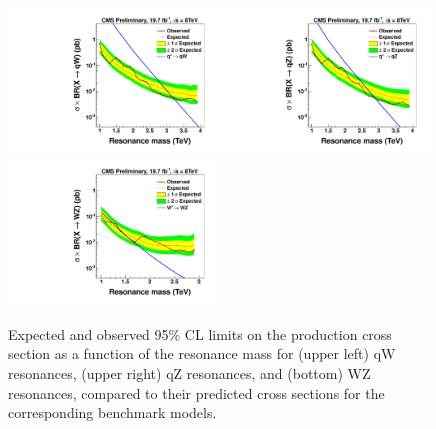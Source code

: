 \begin{figure}[h!tb]
\centering
\includegraphics[width=0.49\textwidth]{EXO-12-024/figs/limits/brazilianFlag_qW_combined.pdf}
\includegraphics[width=0.49\textwidth]{EXO-12-024/figs/limits/brazilianFlag_qZ_combined.pdf}
\includegraphics[width=0.49\textwidth]{EXO-12-024/figs/limits/brazilianFlag_WZ_combined.pdf}

\caption{Expected and observed 95\% CL limits on the production
  cross section as a function of the resonance mass for (upper left)
  qW resonances, (upper right) qZ resonances, and (bottom) WZ
  resonances, compared to their predicted cross sections for the
  corresponding benchmark models.}
\label{fig:Vtagresults}
\end{figure}

